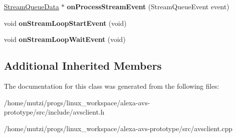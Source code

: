 \begin{DoxyCompactItemize}
\mbox{\label{classAVSClient_ae11fec4bb36751971307088aa68e9c5d}} 
\hyperlink{structNetwork_1_1HTTP2_1_1StreamQueueData}{Stream\+Queue\+Data} $\ast$ {\bfseries on\+Process\+Stream\+Event} (Stream\+Queue\+Event event)
\item 
\mbox{\label{classAVSClient_a8d9ca62de50e2f1c8f9131277728b170}} 
void {\bfseries on\+Stream\+Loop\+Start\+Event} (void)
\item 
\mbox{\label{classAVSClient_a8371fdf83e36adee3292958e13db684e}} 
void {\bfseries on\+Stream\+Loop\+Wait\+Event} (void)
\end{DoxyCompactItemize}
\subsection*{Additional Inherited Members}


The documentation for this class was generated from the following files\+:\begin{DoxyCompactItemize}
\item 
/home/mutzi/progs/linux\+\_\+workspace/alexa-\/avs-\/prototype/src/include/avsclient.\+h\item 
/home/mutzi/progs/linux\+\_\+workspace/alexa-\/avs-\/prototype/src/avsclient.\+cpp\end{DoxyCompactItemize}
